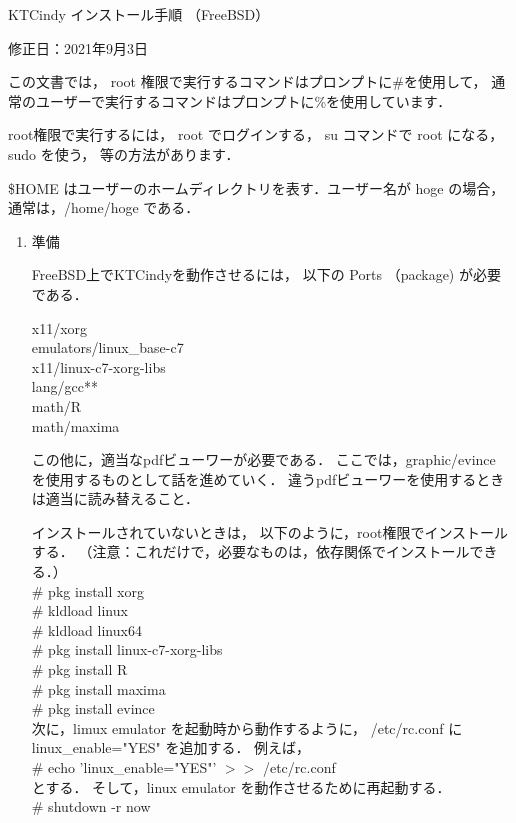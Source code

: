 \documentclass[a4paper,12pt]{jarticle}
\begin{document}
\begin{center}
 K\raisebox{-0.3zw}{E}TCindy インストール手順 （FreeBSD）
\end{center}
\begin{flushright}
 修正日：2021年9月3日
\end{flushright}

この文書では，
root 権限で実行するコマンドはプロンプトに\#を使用して，
通常のユーザーで実行するコマンドはプロンプトに\%を使用しています．

root権限で実行するには，
root でログインする，
su コマンドで root になる，
sudo を使う，
等の方法があります．

\$HOME はユーザーのホームディレクトリを表す．ユーザー名が hoge の場合，
通常は，/home/hoge である．

\begin{enumerate}
 \item 準備

FreeBSD上でK\raisebox{-0.3zw}{E}TCindyを動作させるには，
以下の Ports （package) が必要である．

\noindent
x11/xorg
\\
\noindent
emulators/linux\_base-c7
\\
\noindent
x11/linux-c7-xorg-libs
\\
\noindent
lang/gcc**
\\
\noindent
math/R
\\
\noindent
math/maxima

この他に，適当なpdfビューワーが必要である．
ここでは，graphic/evince を使用するものとして話を進めていく．
違うpdfビューワーを使用するときは適当に読み替えること．

インストールされていないときは，
以下のように，root権限でインストールする．
（注意：これだけで，必要なものは，依存関係でインストールできる．）
\\[0.5zw]
\noindent
\# pkg install xorg
\\
\noindent
\# kldload linux
\\
\noindent
\# kldload linux64
\\
\noindent
\# pkg install linux-c7-xorg-libs
\\
\noindent
\# pkg install R
\\
\noindent
\# pkg install maxima
\\
\noindent
\# pkg install evince
\\[0.5zw]
次に，limux emulator を起動時から動作するように，
/etc/rc.conf に linux\_enable="YES" を追加する．
例えば，
\\[0.5zw]
\noindent
\# echo 'linux\_enable="YES"' $>>$  /etc/rc.conf
\\[0.5zw]
とする．
そして，linux emulator を動作させるために再起動する．
\\[0.5zw]
\noindent
\# shutdown -r now


\end{enumerate}
\end{document}
